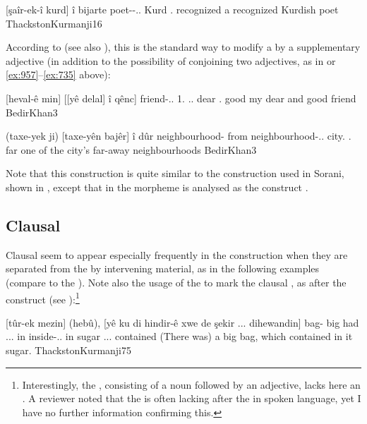 {[şaîr-ek-î kurd] î bijarte}
{poet-\indef-\ez.\indef.\masc{} Kurd \lnk.\ez{} recognized}
{a recognized Kurdish poet}
{ThackstonKurmanji}{16}




According to \citet[3]{BedirKhan} (see also \cite[158, \S 263.(c).(ii)]{MacKenzie}), this is the standard way to modify a \prim by  a supplementary adjective (in addition to the possibility of conjoining two adjectives, as in  or \ref{ex:957}--\ref{ex:735} above):

{[heval-ê min] [[yê delal] î qênc]}
{friend-\ez..\masc{} 1\sg.\obl{} \lnk.\ez.\masc{} dear \lnk.\ez{} good}
{my dear and good friend}
{BedirKhan}{3}

{(taxe-yek ji) [taxe-yên bajêr] î dûr}
{neighbourhood-\indef{} from neighbourhood-\ez..\pl{} city.\obl{} \lnk.\ez{} far}
{one of the city's far-away neighbourhoods}
{BedirKhan}{3}

Note that this construction is quite similar to the construction used in Sorani, shown in , except that in \Sor the  morpheme is analysed as the construct \ez*.



\subsection{Clausal \secns} \label{ss:lnk_ez_clausal}

Clausal \secns seem to appear especially frequently in the \lnk* \ez* construction when they are separated from the \prim by intervening material, as in the following examples (compare to the  \Qar {}). Note also the usage of the \rel* to mark the clausal \secn, as after the construct \ez* (see ):\footnote{Interestingly, the \prim, consisting of a noun followed by an adjective, lacks here an \ez*. A reviewer noted that the \ez* is often lacking after the  in spoken language, yet I have no further information confirming this.}


{[tûr-ek mezin] (hebû), [yê ku di hindir-ê xwe de şekir ... dihewandin]}
{bag-\indef{} big had \lnk.\ez..\masc{} \rel{} in inside-\ez..\masc{}  in sugar ... contained}
{(There was) a big bag, which contained in it sugar.}
{ThackstonKurmanji}{75}

